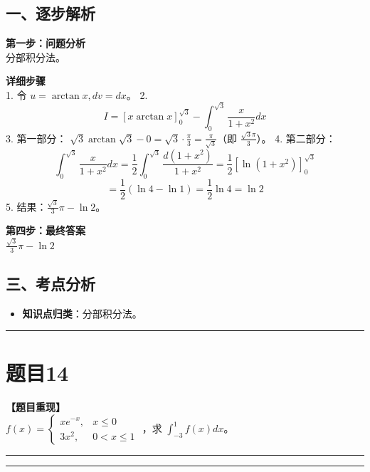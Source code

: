 \documentclass[12pt, a4paper]{ctexart}
\newcommand{\TopSeparator}{
    \par\noindent\rule{\textwidth}{1.5pt}\vspace{0.5em} %
}
\newcommand{\AnalysisSeparator}{
    \par\noindent\rule{\textwidth}{0.5pt}\vspace{0.2em}\hrule\vspace{0.5em} %
}
\newenvironment{RedAnalysis}{
    \par
    \color{red} %
}{
    \par
    \color{black} %
}
\begin{document}
\begin{RedAnalysis}

\subsection*{一、逐步解析}

\textbf{第一步：问题分析} \\
分部积分法。

\textbf{详细步骤} \\
1. 令 $u = \arctan x, dv = dx$。
2. \[ I = [x \arctan x]_0^{\sqrt{3}} - \int_0^{\sqrt{3}} \frac{x}{1+x^2} dx \]
3. 第一部分：
   $\sqrt{3} \arctan \sqrt{3} - 0 = \sqrt{3} \cdot \frac{\pi}{3} = \frac{\pi}{\sqrt{3}}$（即 $\frac{\sqrt{3}\pi}{3}$）。
4. 第二部分：
   \[ \int_0^{\sqrt{3}} \frac{x}{1+x^2} dx = \frac{1}{2}\int_0^{\sqrt{3}} \frac{d(1+x^2)}{1+x^2} = \frac{1}{2} [\ln(1+x^2)]_0^{\sqrt{3}} \]
   \[ = \frac{1}{2} (\ln 4 - \ln 1) = \frac{1}{2} \ln 4 = \ln 2 \]
5. 结果：$\frac{\sqrt{3}}{3}\pi - \ln 2$。

\textbf{第四步：最终答案} \\
$ \frac{\sqrt{3}}{3}\pi - \ln 2 $

\subsection*{三、考点分析}
\begin{itemize}
    \item \textbf{知识点归类}：分部积分法。
\end{itemize}

\end{RedAnalysis}

\vspace{2em}

\TopSeparator
\section*{题目14}

\textbf{【题目重现】} \\
$ f(x)=\begin{cases}xe^{-x}, & x\leq0\\ 3x^{2}, & 0<x\leq1\end{cases} $ ，求 $ \int_{-3}^{1}f(x)dx $。

\AnalysisSeparator
\end{document}

